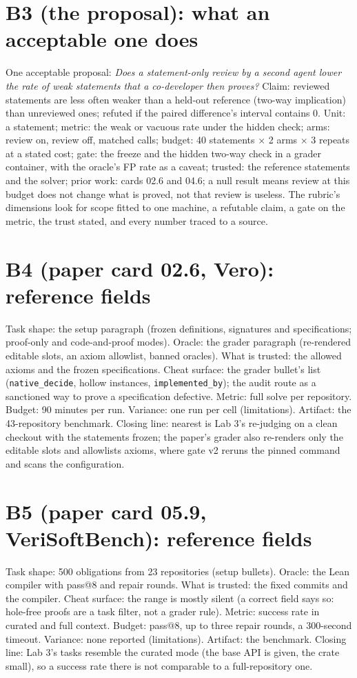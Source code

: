 \documentclass[11pt]{article}
\begin{document}
\section*{B3 (the proposal): what an acceptable one does}
One acceptable proposal: \emph{Does a statement-only review by a second agent
lower the rate of weak statements that a co-developer then proves?} Claim:
reviewed statements are less often weaker than a held-out reference
(two-way implication) than unreviewed ones; refuted if the paired
difference's interval contains 0. Unit: a statement; metric: the weak or
vacuous rate under the hidden check; arms: review on, review off, matched
calls; budget: 40 statements $\times$ 2 arms $\times$ 3 repeats at a stated
cost; gate: the freeze and the hidden two-way check in a grader container,
with the oracle's FP rate as a caveat; trusted: the reference statements and
the solver; prior work: cards 02.6 and 04.6; a null result means review at
this budget does not change what is proved, not that review is useless. The
rubric's dimensions look for scope fitted to one machine, a refutable claim,
a gate on the metric, the trust stated, and every number traced to a source.

\section*{B4 (paper card 02.6, Vero): reference fields}
Task shape: the setup paragraph (frozen definitions, signatures and
specifications; proof-only and code-and-proof modes). Oracle: the grader
paragraph (re-rendered editable slots, an axiom allowlist, banned oracles).
What is trusted: the allowed axioms and the frozen specifications. Cheat
surface: the grader bullet's list (\texttt{native\_decide}, hollow instances,
\texttt{implemented\_by}); the audit route as a sanctioned way to prove a
specification defective. Metric: full solve per repository. Budget: 90
minutes per run. Variance: one run per cell (limitations). Artifact: the
43-repository benchmark. Closing line: nearest is Lab 3's re-judging on a
clean checkout with the statements frozen; the paper's grader also
re-renders only the editable slots and allowlists axioms, where gate v2 reruns
the pinned command and scans the configuration.

\section*{B5 (paper card 05.9, VeriSoftBench): reference fields}
Task shape: 500 obligations from 23 repositories (setup bullets). Oracle: the
Lean compiler with pass@8 and repair rounds. What is trusted: the fixed
commits and the compiler. Cheat surface: the range is mostly silent (a
correct field says so: hole-free proofs are a task filter, not a grader
rule). Metric: success rate in curated and full context. Budget: pass@8, up
to three repair rounds, a 300-second timeout. Variance: none reported
(limitations). Artifact: the benchmark. Closing line: Lab 3's tasks resemble
the curated mode (the base API is given, the crate small), so a success rate
there is not comparable to a full-repository one.
\end{document}
